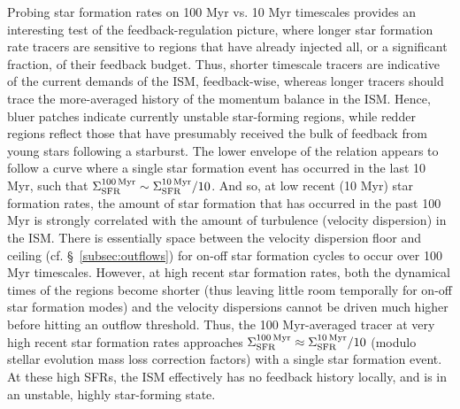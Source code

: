 \documentclass[usletter,fleqn,usenatbib]{mnras}
\begin{document}
Probing star formation rates on 100 Myr vs. 10 Myr timescales provides an interesting test of the feedback-regulation picture, where longer star formation rate tracers are sensitive to regions that have already injected all, or a significant fraction, of their feedback budget.  Thus, shorter timescale tracers are indicative of the current demands of the ISM, feedback-wise, whereas longer tracers should trace the more-averaged history of the momentum balance in the ISM.  Hence, bluer patches indicate currently unstable star-forming regions, while redder regions reflect those that have presumably received the bulk of feedback from young stars following a starburst. The lower envelope of the relation appears to follow a curve where a single star formation event has occurred in the last 10 Myr, such that $\Sigma_{\rm SFR}^{\rm 100 \, Myr} \sim \Sigma_{\rm SFR}^{\rm 10 \, Myr}/10$.  And so, at low recent (10 Myr) star formation rates, the amount of star formation that has occurred in the past 100 Myr is strongly correlated with the amount of turbulence (velocity dispersion) in the ISM.  There is essentially space between the velocity dispersion floor and ceiling (cf. \S~\ref{subsec:outflows}) for on-off star formation cycles to occur over 100 Myr timescales.  However, at high recent star formation rates, both the dynamical times of the regions become shorter (thus leaving little room temporally for on-off star formation modes) and the velocity dispersions cannot be driven much higher before hitting an outflow threshold.  Thus, the 100 Myr-averaged tracer at very high recent star formation rates approaches $\Sigma_{\rm SFR}^{\rm 100 \, Myr} \approx \Sigma_{\rm SFR}^{\rm 10 \, Myr}/10$ (modulo stellar evolution mass loss correction factors) with a single star formation event. At these high SFRs, the ISM effectively has no feedback history locally, and is in an unstable, highly star-forming state.
\end{document}
